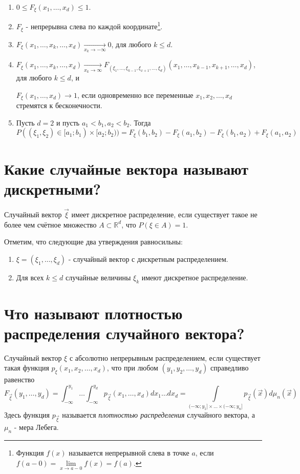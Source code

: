 \begin{enumerate}
	\item $0 \le F_{\xi} (x_1, \dots, x_d) \le 1$.
	\item $F_{\xi}$ - непрерывна слева по каждой координате\footnote{Функция $f(x)$ называется непрерывной слева в точке $a$, если $f(a-0) = \lim\limits_{x \to a - 0} f(x) = f(a)$.}.
	\item $F_{\xi} (x_1, \dots, x_k, \dots, x_d) \underset{x_k \to - \infty}{\to} 0$, для любого $k \le d$.
	\item $F_{\xi} (x_1, \dots, x_k, \dots, x_d) \underset{x_k \to \infty}{\to} F_{(\xi_1, \dots, \xi_{k-1}, \xi_{x+1}, \dots, \xi_d)} (x_1, \dots, x_{k-1}, x_{k+1}, \dots, x_d)$, для любого $k \le d$, и
	
	$F_{\xi} (x_1, \dots, x_d) \to 1$, если одновременно все переменные $x_1, x_2, \dots, x_d$ стремятся к бесконечности.
	\item Пусть $d=2$ и пусть $a_1 < b_1, a_2 < b_2$. Тогда
	\[ P( (\xi_1, \xi_2) \in [a_1;b_1) \times [a_2;b_2) ) = F_{\xi} (b_1, b_2) - F_{\xi} (a_1, b_2) - F_{\xi} (b_1, a_2) + F_{\xi} (a_1, a_2) \]
\end{enumerate}

\section{Какие случайные вектора называют дискретными?}

Случайный вектор $\vec{\xi}$ имеет дискретное распределение, если существует такое не более чем счётное множество $A \subset \mathbb{R}^d$, что $P(\xi \in A) = 1$.

Отметим, что следующие два утверждения равносильны:
\begin{enumerate}
	\item $\xi = (\xi_1, \dots, \xi_d)$ - случайный вектор с дискретным распределением.
	\item Для всех $k \le d$ случайные величины $\xi_k$ имеют дискретное распределение.
\end{enumerate}

\section{Что называют плотностью распределения случайного вектора?}

Случайный вектор $\xi$ с абсолютно непрерывным распределением, если существует такая функция $p_{\xi} (x_1, x_2, \dots, x_d)$, что при любом $(y_1, y_2, \dots, y_d)$ справедливо равенство
\[ F_{\vec{\xi}} (y_1, \dots, y_d) = \int_{-\infty}^{y_1} \dots \int_{-\infty}^{y_d} p_{\vec{\xi}} (x_1, \dots, x_d) dx_1 \dots dx_d = \int\limits_{( - \infty; y_1 ] \times \dots \times ( - \infty; y_n ]} p_{\vec{\xi}} (\vec{x}) d \mu_n (\vec{x}) \]
Здесь функция $p_{\vec{\xi}}$ называется \textit{плотностью распределения} случайного вектора, а $\mu_n$ - мера Лебега.

